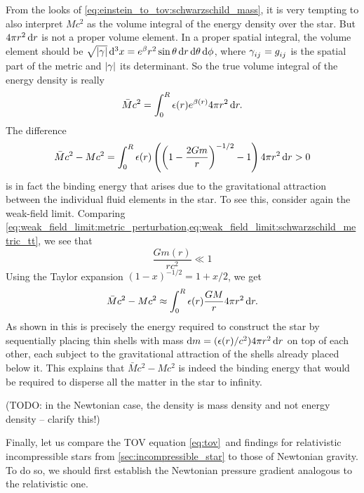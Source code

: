 From the looks of \cref{eq:einstein_to_tov:schwarzschild_mass}, it is very tempting to also interpret $M c^2$ as the volume integral of the energy density over the star.
But $4 \pi r^2 \dif r$ is not a proper volume element.
In a proper spatial integral, the volume element should be $\sqrt{\abs{\gamma}} \dif^3 x = e^\beta r^2 \sin \theta \dif r \dif \theta \dif \phi$, where $\gamma\indices{_i_j} = g\indices{_i_j}$ is the spatial part of the metric and $\abs{\gamma}$ its determinant.
So the true volume integral of the energy density is really
\begin{equation*}
	\bar{M} c^2 = \integral{\epsilon(r) e^{\beta(r)} 4 \pi r^2}{r}{0}{R}.
\end{equation*}
The difference
\begin{equation*}
	\bar{M} c^2 - M c^2 = \integral{\epsilon(r) \left( \left( 1-\frac{2Gm}{r} \right)^{-1/2} - 1 \right) 4 \pi r^2}{r}{0}{R} > 0
\end{equation*}
is in fact the binding energy that arises due to the gravitational attraction between the individual fluid elements in the star.
To see this, consider again the weak-field limit.
Comparing \cref{eq:weak_field_limit:metric_perturbation,eq:weak_field_limit:schwarzschild_metric_tt}, we see that
\begin{equation}
	\frac{G m(r)}{rc^2} \ll 1
	\label{eq:weak_field_limit:small_gmr}
\end{equation}
Using the Taylor expansion $(1 - x)^{-1/2} = 1 + x/2$, we get
\begin{equation}
	\bar{M} c^2 - M c^2 \approx \integral{\epsilon(r) \frac{GM}{r} 4 \pi r^2}{r}{0}{R} .
\end{equation}
As shown in \cite[exercise 23.7]{ref:mtw} this is precisely the energy required to construct the star by sequentially placing thin shells with mass $\dif m = (\epsilon(r)/c^2) 4 \pi r^2 \dif r$ on top of each other, each subject to the gravitational attraction of the shells already placed below it.
This explains that $\bar{M} c^2 - M c^2$ is indeed the binding energy that would be required to disperse all the matter in the star to infinity.

(TODO: in the Newtonian case, the density is mass density and not energy density -- clarify this!)

Finally, let us compare the TOV equation \eqref{eq:tov} and findings for relativistic incompressible stars from \cref{sec:incompressible_star} to those of Newtonian gravity.
To do so, we should first establish the Newtonian pressure gradient analogous to the relativistic one.

